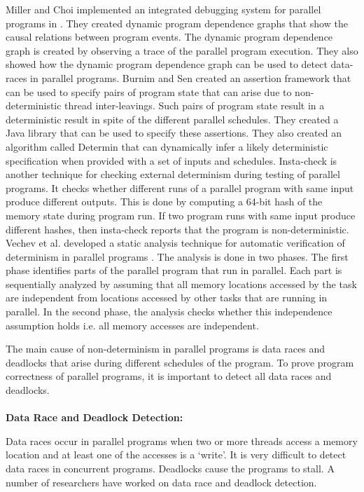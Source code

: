 Miller and Choi implemented an integrated debugging system for parallel programs in \cite{miller1988mechanism}. They created dynamic program dependence graphs that show the causal relations between program events. The dynamic program dependence graph is created by observing a trace of the parallel program execution. They also showed how the dynamic program dependence graph can be used to detect data-races in parallel programs. Burnim and Sen created an assertion framework that can be used to specify pairs of program state that can arise due to non-deterministic thread inter-leavings\cite{burnim2009asserting}. Such pairs of program state result in a deterministic result in spite of the different parallel schedules. They created a Java library that can be used to specify these assertions. They also created an algorithm called Determin \cite{burnim2010determin} that can dynamically infer a likely deterministic specification when provided with a set of inputs and schedules. Insta-check \cite{nistor2010instantcheck} is another technique for checking external determinism during testing of parallel programs. It checks whether different runs of a parallel program with same input produce different outputs. This is done by computing a 64-bit hash of the memory state during program run. If two program runs with same input produce different hashes, then insta-check reports that the program is non-deterministic. Vechev et al. developed a static analysis technique for automatic verification of determinism in parallel programs \cite{vechev2011automatic}. The analysis is done in two phases. The first phase identifies parts of the parallel program that run in parallel. Each part is sequentially analyzed by assuming that all memory locations accessed by the task are independent from locations accessed by other tasks that are running in parallel. In the second phase, the analysis checks whether this independence assumption holds i.e. all memory accesses are independent.

The main cause of non-determinism in parallel programs is data races and deadlocks that arise during different schedules of the program. To prove program correctness of parallel programs, it is important to detect all data races and deadlocks.
\\
\\
\textbf{Data Race and Deadlock Detection: }

Data races occur in parallel programs when two or more threads access a memory location and at least one of the accesses is a ‘write’.  It is very difficult to detect data races in concurrent programs. Deadlocks cause the programs to stall. A number of researchers have worked on data race and deadlock detection.

